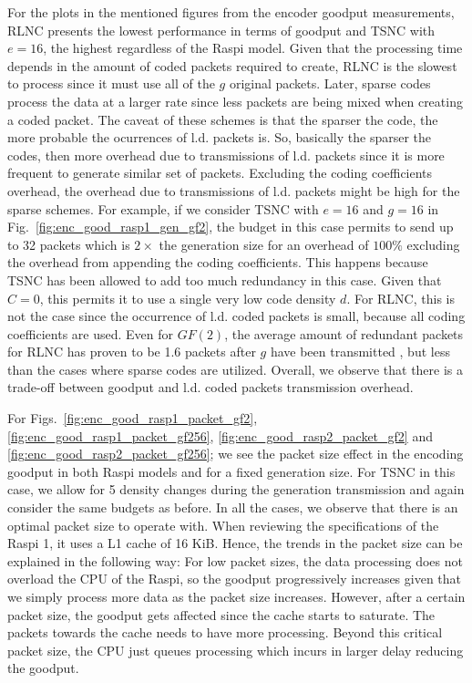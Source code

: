 For the plots in the mentioned figures from the encoder goodput measurements,
\ac{RLNC} presents the lowest performance in terms of goodput and
\ac{TSNC} with $e = 16$, the highest regardless of the \ac{Raspi} model.
Given that the processing time depends in the amount of coded packets
required to create, \ac{RLNC} is the slowest to process since it must
use all of the $g$ original packets. Later, sparse codes process the data
at a larger rate since less packets are being mixed when creating a
coded packet. The caveat of these schemes is that the sparser the code,
the more probable the ocurrences of \ac{l.d.} packets is. So, basically
the sparser the codes, then more overhead due to transmissions of \ac{l.d.}
packets since it is more frequent to generate similar set of packets.
Excluding the coding coefficients overhead, the overhead due to
transmissions of \ac{l.d.} packets might be high for the sparse schemes.
For example, if we consider \ac{TSNC} with $e = 16$ and $g = 16$
in Fig.~\ref{fig:enc_good_rasp1_gen_gf2}, the budget in this case permits
to send up to 32 packets which is $2\times$ the generation
size for an overhead of $100\%$ excluding the overhead from appending
the coding coefficients. This happens because \ac{TSNC}
has been allowed to add too much redundancy in this case. Given that $C=0$,
this permits it to use a single very low code density $d$. For \ac{RLNC},
this is not the case since the occurrence of \ac{l.d.} coded packets is
small, because all coding coefficients are used. Even for $GF(2)$, the
average amount of redundant packets for \ac{RLNC} has proven to be 1.6
packets after $g$ have been transmitted \cite{trullols2011exact,zhao2012notes},
but less than the cases where sparse codes are utilized. Overall, we
observe that there is a trade-off between goodput and \ac{l.d.} coded
packets transmission overhead.

For Figs.~\ref{fig:enc_good_rasp1_packet_gf2},
\ref{fig:enc_good_rasp1_packet_gf256}, \ref{fig:enc_good_rasp2_packet_gf2}
and \ref{fig:enc_good_rasp2_packet_gf256}; we see the packet
size effect in the encoding goodput in both \ac{Raspi} models and for
a fixed generation size. For \ac{TSNC} in this case, we allow for 5 density
changes during the generation transmission and again consider the same
budgets as before. In all the cases, we observe that there is an
optimal packet size to operate with. When reviewing the specifications
of the \ac{Raspi} 1, it uses a L1 cache of 16 KiB. Hence, the trends
in the packet size can be explained in the following way: For low packet
sizes, the data processing does not overload the \ac{CPU} of the
\ac{Raspi}, so the goodput progressively increases given that we simply
process more data as the packet size increases. However, after a certain
packet size, the goodput gets affected since the cache starts to saturate.
The packets towards the cache needs to have more processing. Beyond this
critical packet size, the \ac{CPU} just queues processing which incurs in
larger delay reducing the goodput.

